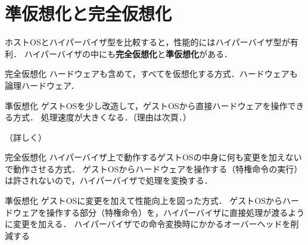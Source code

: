 \section{準仮想化と完全仮想化}
\tocc
\begin{frame}[t]{\fftitle}
    ホストOSとハイパーバイザ型を比較すると，性能的にはハイパーバイザ型が有利．
    ハイパーバイザの中にも\textbf{完全仮想化}と\textbf{準仮想化}がある．
    \begin{block}{完全仮想化}
        ハードウェアも含めて，すべてを仮想化する方式．ハードウェアも論理ハードウェア．
    \end{block}
    \begin{block}{準仮想化}
        ゲストOSを少し改造して，ゲストOSから直接ハードウェアを操作できる方式．
        処理速度が大きくなる．（理由は次頁．）
    \end{block}
\end{frame}
\begin{frame}[t]{\fftitle （詳しく）}
    \begin{block}{完全仮想化}
        ハイパーバイザ上で動作するゲストOSの中身に何も変更を加えないで動作させる方式．
        ゲストOSからハードウェアを操作する（特権命令の実行）は許されないので，ハイパーバイザで処理を変換する．
    \end{block}
    \begin{block}{準仮想化}
        ゲストOSに変更を加えて性能向上を図った方式．
        ゲストOSからハードウェアを操作する部分（特権命令）を，ハイパーバイザに直接処理が渡るように変更を加える．
        ハイパーバイザでの命令変換時にかかるオーバーヘッドを削減する
    \end{block}
    \hfill\cite{仮想化技術}
\end{frame}

